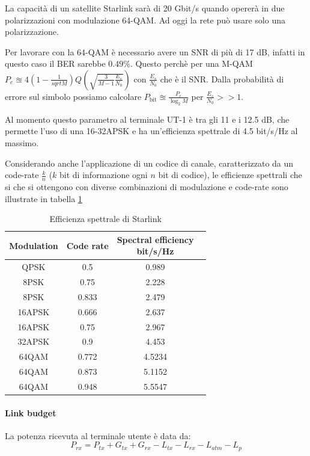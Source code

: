 La capacità di un satellite Starlink sarà di 20 Gbit/s quando opererà in due polarizzazioni con modulazione 64-\ac{QAM}.
Ad oggi la rete può usare solo una polarizzazione.

Per lavorare con la 64-\ac{QAM} è necessario avere un \ac{SNR} di più di 17 dB, infatti in questo caso il \ac{BER} sarebbe $0.49 \%$.
Questo perchè per una M-\ac{QAM} $P_e \approxeq 4 (1-\frac{1}{sqrt{M}}) Q(\sqrt{\frac{3}{M - 1} \frac{E_s}{N_0}})$ con $\frac{E_s}{N_0}$ che è il SNR.
Dalla probabilità di errore sul simbolo possiamo calcolare $P_{\text{bit}} \approxeq \frac{P_e}{\log_2 M}$ per $\frac{E_s}{N_0} >> 1$.

Al momento questo parametro al terminale UT-1 è tra gli 11 e i 12.5 dB, che permette l'uso di una 16-32\acs{APSK} e ha un'efficienza spettrale di 4.5 bit/s/Hz al massimo.

Considerando anche l'applicazione di un codice di canale, 
caratterizzato da un code-rate $\frac{k}{n}$ ($k$ bit di informazione ogni $n$ bit di codice), le efficienze spettrali che si che si ottengono con diverse combinazioni di modulazione e code-rate sono illustrate in tabella \ref{tab:spectral-efficiency}

\begin{table}[h]
\centering
\begin{tabular}{|c|c|c|c|}
\hline
\textbf{Modulation} & \textbf{Code rate} & \makecell{\textbf{Spectral efficiency}\\ \textbf{bit/s/Hz}} \\ \hline
QPSK     & 0.5   & 0.989  \\ \hline
8PSK     & 0.75  & 2.228  \\ \hline
8PSK     & 0.833 & 2.479  \\ \hline
16APSK   & 0.666 & 2.637  \\ \hline
16APSK   & 0.75  & 2.967  \\ \hline
32APSK   & 0.9   & 4.453  \\ \hline
64QAM    & 0.772 & 4.5234 \\ \hline
64QAM    & 0.873 & 5.1152 \\ \hline
64QAM    & 0.948 & 5.5547 \\ \hline
\end{tabular}
\caption{Efficienza spettrale di Starlink \cite{rozenvasser_estimation_2023}}
\label{tab:spectral-efficiency}
\end{table}

\paragraph{Link budget}
La potenza ricevuta al terminale utente è data da:
\begin{equation}
P_{rx} = P_{tx} + G_{tx} + G_{rx} - L_{tx} - L_{rx} - L_{atm} - L_{p}
\label{eq:received-power}
\end{equation}

